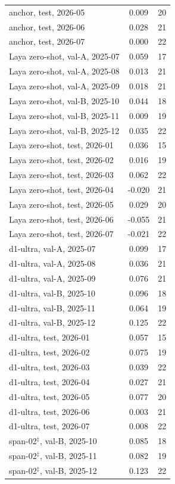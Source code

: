 \begin{longtable}{@{}lS[table-format=-1.3]S[table-format=2.0]@{}}
anchor, test, 2026-05 & 0.009 & 20 \\
anchor, test, 2026-06 & 0.028 & 21 \\
anchor, test, 2026-07 & 0.000 & 22 \\
Laya zero-shot, val-A, 2025-07 & 0.059 & 17 \\
Laya zero-shot, val-A, 2025-08 & 0.013 & 21 \\
Laya zero-shot, val-A, 2025-09 & 0.018 & 21 \\
Laya zero-shot, val-B, 2025-10 & 0.044 & 18 \\
Laya zero-shot, val-B, 2025-11 & 0.009 & 19 \\
Laya zero-shot, val-B, 2025-12 & 0.035 & 22 \\
Laya zero-shot, test, 2026-01 & 0.036 & 15 \\
Laya zero-shot, test, 2026-02 & 0.016 & 19 \\
Laya zero-shot, test, 2026-03 & 0.062 & 22 \\
Laya zero-shot, test, 2026-04 & -0.020 & 21 \\
Laya zero-shot, test, 2026-05 & 0.029 & 20 \\
Laya zero-shot, test, 2026-06 & -0.055 & 21 \\
Laya zero-shot, test, 2026-07 & -0.021 & 22 \\
d1-ultra, val-A, 2025-07 & 0.099 & 17 \\
d1-ultra, val-A, 2025-08 & 0.036 & 21 \\
d1-ultra, val-A, 2025-09 & 0.076 & 21 \\
d1-ultra, val-B, 2025-10 & 0.096 & 18 \\
d1-ultra, val-B, 2025-11 & 0.064 & 19 \\
d1-ultra, val-B, 2025-12 & 0.125 & 22 \\
d1-ultra, test, 2026-01 & 0.057 & 15 \\
d1-ultra, test, 2026-02 & 0.075 & 19 \\
d1-ultra, test, 2026-03 & 0.039 & 22 \\
d1-ultra, test, 2026-04 & 0.027 & 21 \\
d1-ultra, test, 2026-05 & 0.077 & 20 \\
d1-ultra, test, 2026-06 & 0.003 & 21 \\
d1-ultra, test, 2026-07 & 0.008 & 22 \\
span-02$^{\ddagger}$, val-B, 2025-10 & 0.085 & 18 \\
span-02$^{\ddagger}$, val-B, 2025-11 & 0.082 & 19 \\
span-02$^{\ddagger}$, val-B, 2025-12 & 0.123 & 22 \\

\end{longtable}
